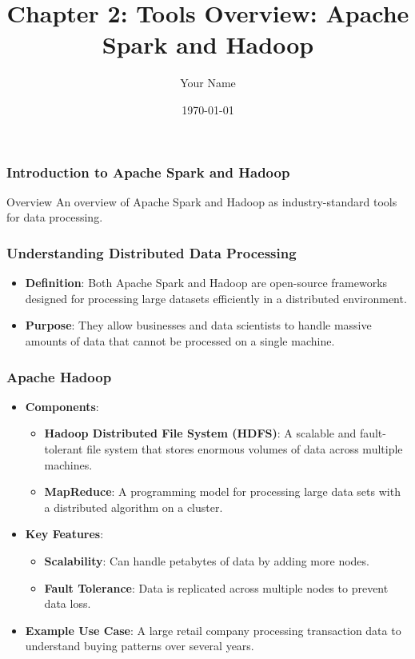 \documentclass{beamer}
\title{Chapter 2: Tools Overview: Apache Spark and Hadoop}
\author{Your Name}
\institute{Your Institution}
\date{\today}
\begin{document}
\frame{\titlepage}

\begin{frame}[fragile]
    \frametitle{Introduction to Apache Spark and Hadoop}
    \begin{block}{Overview}
        An overview of Apache Spark and Hadoop as industry-standard tools for data processing.
    \end{block}
\end{frame}

\begin{frame}[fragile]
    \frametitle{Understanding Distributed Data Processing}
    \begin{itemize}
        \item \textbf{Definition}: Both Apache Spark and Hadoop are open-source frameworks designed for processing large datasets efficiently in a distributed environment.
        \item \textbf{Purpose}: They allow businesses and data scientists to handle massive amounts of data that cannot be processed on a single machine.
    \end{itemize}
\end{frame}

\begin{frame}[fragile]
    \frametitle{Apache Hadoop}
    \begin{itemize}
        \item \textbf{Components}:
            \begin{itemize}
                \item \textbf{Hadoop Distributed File System (HDFS)}: A scalable and fault-tolerant file system that stores enormous volumes of data across multiple machines.
                \item \textbf{MapReduce}: A programming model for processing large data sets with a distributed algorithm on a cluster.
            \end{itemize}
        \item \textbf{Key Features}:
            \begin{itemize}
                \item \textbf{Scalability}: Can handle petabytes of data by adding more nodes.
                \item \textbf{Fault Tolerance}: Data is replicated across multiple nodes to prevent data loss.
            \end{itemize}
        \item \textbf{Example Use Case}: A large retail company processing transaction data to understand buying patterns over several years.
    \end{itemize}
\end{frame}
\end{document}
